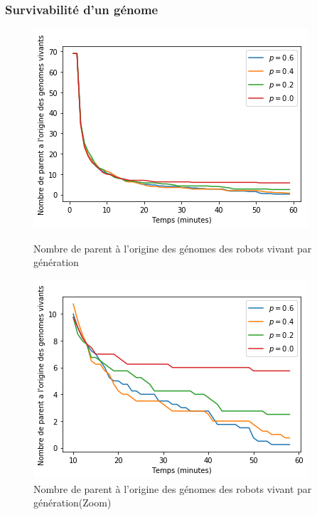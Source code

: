 \documentclass[a4paper]{article}
\begin{document}
\subsubsection{Survivabilité d'un génome}
\begin{figure}[h]
	\begin{minipage}[c]{.46\linewidth}
		\centering
		\includegraphics[width=1.1\linewidth]{../../script_results/parent_origine_medea_full.png}
		\caption{Nombre de parent à l'origine des génomes des robots vivant par génération}
	\end{minipage}
	\hfill%
	\begin{minipage}[c]{.46\linewidth}
		\centering
		\includegraphics[width=1.1\linewidth]{../../script_results/parent_origine_medea_zoom.png}
		\caption{Nombre de parent à l'origine des génomes des robots vivant par génération(Zoom)}
	\end{minipage}
\end{figure}
\end{document}
